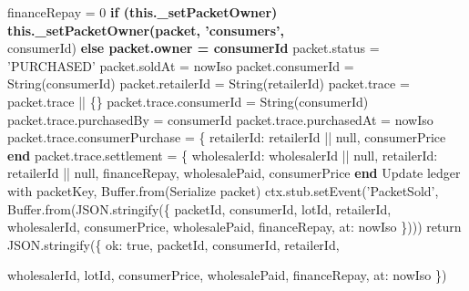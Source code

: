 \documentclass[12pt]{article}
\begin{document}
\begin{algorithm}[H]
\caption{purchasePacket() (Part 2 of 3)}
financeRepay = 0\;
\textbf{if (this.\_setPacketOwner) this.\_setPacketOwner(packet, 'consumers',}\\
\quad consumerId)\;
\textbf{else packet.owner = consumerId}\;
packet.status = 'PURCHASED'\;
packet.soldAt = nowIso\;
packet.consumerId = String(consumerId)\;
packet.retailerId = String(retailerId)\;
packet.trace = packet.trace || \{\}\;
packet.trace.consumerId = String(consumerId)\;
packet.trace.purchasedBy = consumerId\;
packet.trace.purchasedAt = nowIso\;
packet.trace.consumerPurchase = \{\;
retailerId: retailerId || null,\;
consumerPrice\;
\textbf{end}\;
packet.trace.settlement = \{\;
wholesalerId: wholesalerId || null,\;
retailerId: retailerId || null,\;
financeRepay,\;
wholesalePaid,\;
consumerPrice\;
\textbf{end}\;
Update ledger with packetKey, Buffer.from(Serialize packet)\;
ctx.stub.setEvent('PacketSold', Buffer.from(JSON.stringify(\{\;
packetId,\;
consumerId,\;
lotId,\;
retailerId,\;
wholesalerId,\;
consumerPrice,\;
wholesalePaid,\;
financeRepay,\;
at: nowIso\;
\})))\;
return JSON.stringify(\{\;
ok: true,\;
packetId,\;
consumerId,\;
retailerId,\;
\end{algorithm}


\begin{algorithm}[H]
\caption{purchasePacket() (Part 3 of 3)}
wholesalerId,\;
lotId,\;
consumerPrice,\;
wholesalePaid,\;
financeRepay,\;
at: nowIso\;
\})\;
\end{algorithm}
\end{document}
